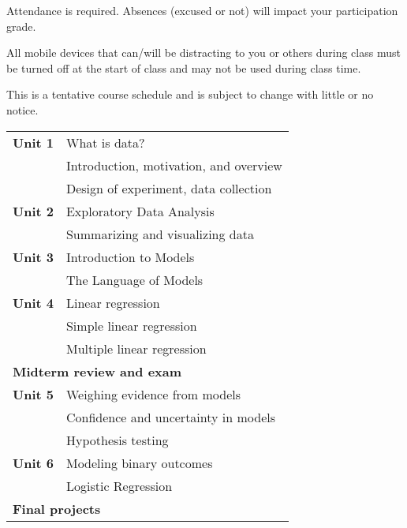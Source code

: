 \documentclass[10pt]{article}
\begin{document}

Attendance is required. Absences (excused or not) will impact your participation grade.

All mobile devices that can/will be distracting to you or others during class must be turned off at the start of class and may not be used during class time.
%  
%  

\bigskip
{}

\noindent This is a tentative course schedule and is subject to change with little or no notice.

\begin{table}[htp]
\begin{tabular}{ll}
\bf Unit 1 & What is data?\\
       & Introduction, motivation, and overview \\
       & Design of experiment, data collection\\
\bf Unit 2 & Exploratory Data Analysis\\
       & Summarizing and visualizing data \\
\bf Unit 3 & Introduction to Models\\
       & The Language of Models\\
\bf Unit 4 & Linear regression \\
       & Simple linear regression \\
       & Multiple linear regression \\
\multicolumn{2}{l}{\bf Midterm review and exam}\\
\bf Unit 5 & Weighing evidence from models\\
       & Confidence and uncertainty in models\\
       & Hypothesis testing\\

\bf Unit 6 & Modeling binary outcomes \\ 
       & Logistic Regression\\

\multicolumn{2}{l}{\bf Final projects}
\end{tabular}
\end{table}%
\end{document}
